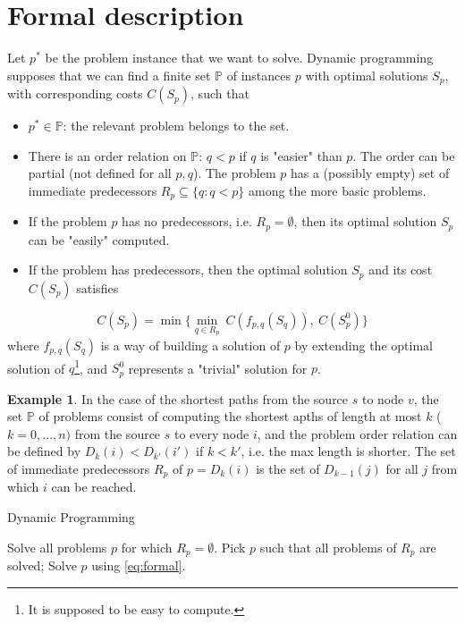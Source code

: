 \documentclass[12pt, openany]{report}
\theoremstyle{definition}
\newtheorem{ex}[thm]{Example}
\begin{document}
\section{Formal description}
Let $p^*$ be the problem instance that we want to solve. Dynamic programming supposes that we can find a finite set $\mathbb{P}$ of instances $p$ with optimal solutions $S_p$, with corresponding costs $C(S_p)$, such that 
\begin{itemize}
    \item $p^*\in \mathbb{P}$: the relevant problem belongs to the set.
    \item There is an order relation on $\mathbb{P}$: $q<p$ if $q$ is "easier" than $p$. The order can be partial (not defined for all $p,q$). The problem $p$ has a (possibly empty) set of immediate predecessors $R_p\subseteq \{q:q<p\}$ among the more basic problems.
    \item If the problem $p$ has no predecessors, i.e. $R_p=\emptyset$, then its optimal solution $S_p$ can be "easily" computed. 
    \item If the problem has predecessors, then the optimal solution $S_p$ and its cost $C(S_p)$ satisfies
\end{itemize}
\begin{equation}\label{eq:formal}
    C(S_p)=\min\{\min_{q\in R_p}\:C(f_{p,q}(S_q)),\:C(S_p^0)\}
\end{equation}
where $f_{p,q}(S_q)$ is a way of building a solution of $p$ by extending the optimal solution of $q$\footnote{It is supposed to be easy to compute.}, and $S_p^0$ represents a "trivial" solution for $p$. 
\begin{ex}
    In the case of the shortest paths from the source $s$ to node $v$, the set $\mathbb{P}$ of problems consist of computing the shortest apths of length at most $k$ ($k=0,\dots,n)$ from the source $s$ to every node $i$, and the problem order relation can be defined by $D_k(i)<D_{k'}(i')$ if $k<k'$, i.e. the max length is shorter. The set of immediate predecessors $R_p$ of $p=D_k(i)$ is the set of $D_{k-1}(j)$ for all $j$ from which $i$ can be reached. 
\end{ex}
\begin{algorithm}
    \caption{Dynamic Programming}\label{algo:dp}
    \begin{algorithmic}[1]
        \State Solve all problems $p$ for which $R_p=\emptyset$.
            \State Pick $p$ such that all problems of $R_p$ are solved;
            \State Solve $p$ using \eqref{eq:formal}.
        \EndWhile
    \end{algorithmic}
\end{algorithm}
\end{document}
